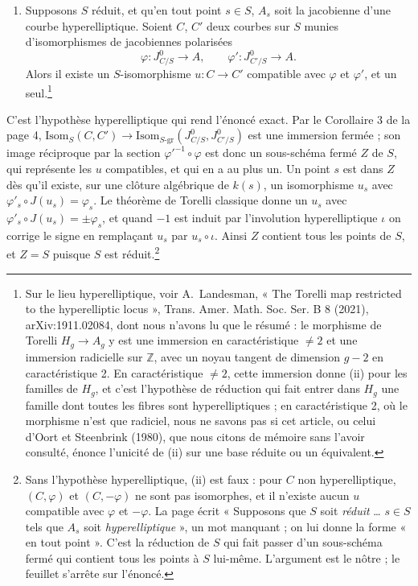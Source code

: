 \documentclass[11pt,a4paper]{article}
\begin{document}
\begin{enumerate}
{soit réduit … $s \in S$ … ») ne se lit pas assez pour dire ce qu'elle
restreint ; la seconde est entourée, et son premier mot pourrait être
« Faux ».}
\item[(ii)] Supposons $S$ réduit, et qu'en tout point $s \in S$, $A_{s}$ soit la jacobienne
d'une courbe hyperelliptique. Soient $C$, $C'$ deux courbes sur $S$ munies
d'isomorphismes de jacobiennes polarisées
\[
  \varphi : J^{0}_{C/S} \longrightarrow A,
  \qquad
  \varphi' : J^{0}_{C'/S} \longrightarrow A.
\]
Alors il existe un $S$-isomorphisme $u : C \to C'$ compatible avec $\varphi$ et
$\varphi'$, et un seul.\footnote{Sur le lieu hyperelliptique, voir
A.~Landesman, « The Torelli map restricted to the hyperelliptic locus »,
Trans. Amer. Math. Soc. Ser. B 8 (2021), arXiv:1911.02084, dont nous
n'avons lu que le résumé : le morphisme de Torelli $H_g \to A_g$ y est une
immersion en caractéristique $\neq 2$ et une immersion radicielle sur
$\mathbb{Z}$, avec un noyau tangent de dimension $g - 2$ en
caractéristique 2. En caractéristique $\neq 2$, cette immersion donne (ii)
pour les familles de $H_g$, et c'est l'hypothèse de réduction qui fait entrer
dans $H_g$ une famille dont toutes les fibres sont hyperelliptiques ; en
caractéristique 2, où le morphisme n'est que radiciel, nous ne savons pas si
cet article, ou celui d'Oort et Steenbrink (1980), que nous citons de mémoire
sans l'avoir consulté, énonce l'unicité de (ii) sur une base réduite ou
un équivalent.}
\end{enumerate}

C'est l'hypothèse hyperelliptique qui rend l'énoncé exact. Par le
Corollaire 3 de la page 4, $\mathrm{Isom}_{S}(C, C') \to
\mathrm{Isom}_{S\text{-gr}}(J^{0}_{C/S}, J^{0}_{C'/S})$ est une immersion
fermée ; son image réciproque par la section $\varphi'^{-1} \circ \varphi$ est
donc un sous-schéma fermé $Z$ de $S$, qui représente les $u$ compatibles, et
qui en a au plus un. Un point $s$ est dans $Z$ dès qu'il existe, sur une
clôture algébrique de $k(s)$, un isomorphisme $u_{s}$ avec
$\varphi'_{s} \circ J(u_{s}) = \varphi_{s}$. Le théorème de Torelli classique
donne un $u_{s}$ avec $\varphi'_{s} \circ J(u_{s}) = \pm \varphi_{s}$, et quand
$-1$ est induit par l'involution hyperelliptique $\iota$ on corrige le signe en
remplaçant $u_{s}$ par $u_{s} \circ \iota$. Ainsi $Z$ contient tous les points
de $S$, et $Z = S$ puisque $S$ est réduit.\footnote{Sans l'hypothèse
hyperelliptique, (ii) est faux : pour $C$ non hyperelliptique,
$(C, \varphi)$ et $(C, -\varphi)$ ne sont pas isomorphes, et il n'existe aucun
$u$ compatible avec $\varphi$ et $-\varphi$. La page écrit « Supposons que
$S$ soit \emph{réduit} … $s \in S$ tels que $A_{s}$ soit
\emph{hyperelliptique} », un mot manquant ; on lui donne la forme « en tout
point ». C'est la réduction de $S$ qui fait passer d'un
sous-schéma fermé qui contient tous les points à $S$ lui-même. L'argument est
le nôtre ; le feuillet s'arrête sur l'énoncé.}
\end{document}
